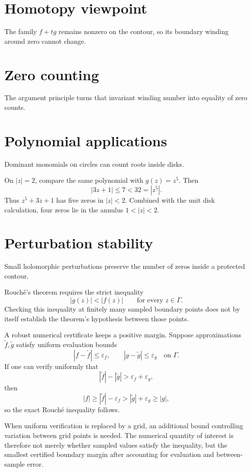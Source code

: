 \section{Homotopy viewpoint}
The family $f+t g$ remains nonzero on the contour, so its boundary winding around zero cannot change.

\section{Zero counting}
The argument principle turns that invariant winding number into equality of zero counts.

\section{Polynomial applications}
Dominant monomials on circles can count roots inside disks.

\begin{example}\label{ex:iv13-expand-02}
On \(|z|=2\), compare the same polynomial with \(g(z)=z^5\). Then
\[
|3z+1|\le7<32=|z^5|.
\]
Thus \(z^5+3z+1\) has five zeros in \(|z|<2\). Combined with the unit disk calculation, four zeros lie in the annulus \(1<|z|<2\).
\end{example}
\section{Perturbation stability}
Small holomorphic perturbations preserve the number of zeros inside a protected contour.

\begin{remark}
Rouch\'e's theorem requires the strict inequality
\[
|g(z)|<|f(z)|
\qquad\text{for every }z\in\Gamma.
\]
Checking this inequality at finitely many sampled boundary points does not by
itself establish the theorem's hypothesis between those points.

A robust numerical certificate keeps a positive margin.  Suppose approximations
\(\widetilde f,\widetilde g\) satisfy uniform evaluation bounds
\[
|f-\widetilde f|\le\varepsilon_f,
\qquad
|g-\widetilde g|\le\varepsilon_g
\quad\text{on }\Gamma.
\]
If one can verify uniformly that
\[
|\widetilde f|-|\widetilde g|
>
\varepsilon_f+\varepsilon_g,
\]
then
\[
|f|
\ge|\widetilde f|-\varepsilon_f
>
|\widetilde g|+\varepsilon_g
\ge|g|,
\]
so the exact Rouch\'e inequality follows.

When uniform verification is replaced by a grid, an additional bound controlling
variation between grid points is needed.  The numerical quantity of interest is
therefore not merely whether sampled values satisfy the inequality, but the
smallest certified boundary margin after accounting for evaluation and
between-sample error.
\end{remark}

